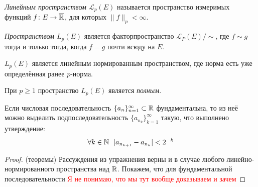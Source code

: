 \begin{definition}
	\textit{Линейным пространством $\mathcal{L}_p(E)$} называется пространство измеримых функций $f \colon E \to \overline{\mathbb{R}}$, для которых $\|f\|_p < \infty$.
\end{definition}

\begin{definition}
	\textit{Пространством $L_p(E)$} является факторпространство $\mathcal{L}_P(E) / \sim$, где $f \sim g$ тогда и только тогда, когда $f = g$ почти всюду на $E$.
\end{definition}

\begin{corollary}
	$L_p(E)$ является линейным нормированным пространством, где норма есть уже определённая ранее $p$-норма.
\end{corollary}

\begin{theorem}
	При $p \ge 1$ пространство $L_p(E)$ является \textit{полным}.
\end{theorem}

\begin{exercise}
	Если числовая последовательность $\{a_n\}_{n = 1}^\infty \subset \mathbb{R}$ фундаментальна, то из неё можно выделить подпоследовательность $\{a_{n_k}\}_{k = 1}^\infty$ такую, что выполнено утверждение:
	\[
		\forall k \in \mathbb{N}\ \ |a_{n_{k + 1}} - a_{n_k}| < 2^{-k}
	\] 
\end{exercise}

\begin{proof} (теоремы)
	Рассуждения из упражнения верны и в случае любого линейно-нормированного пространства над $\mathbb{R}$. Покажем, что для фундаментальной последовательности 
	\textcolor{red}{Я не понимаю, что мы тут вообще доказываем и зачем}
\end{proof}